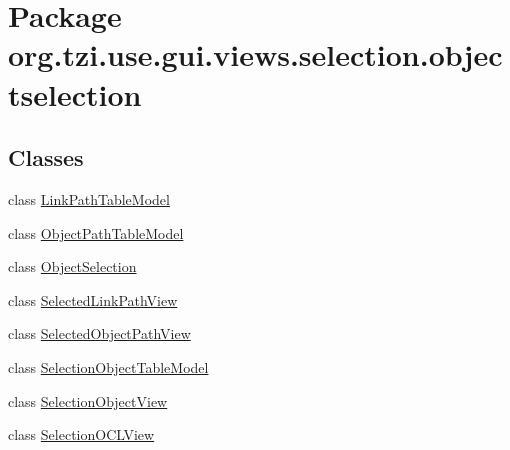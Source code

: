 \hypertarget{namespaceorg_1_1tzi_1_1use_1_1gui_1_1views_1_1selection_1_1objectselection}{\section{Package org.\-tzi.\-use.\-gui.\-views.\-selection.\-objectselection}
\label{namespaceorg_1_1tzi_1_1use_1_1gui_1_1views_1_1selection_1_1objectselection}
}
\subsection*{Classes}
\begin{DoxyCompactItemize}
\item 
class \hyperlink{classorg_1_1tzi_1_1use_1_1gui_1_1views_1_1selection_1_1objectselection_1_1_link_path_table_model}{Link\-Path\-Table\-Model}
\item 
class \hyperlink{classorg_1_1tzi_1_1use_1_1gui_1_1views_1_1selection_1_1objectselection_1_1_object_path_table_model}{Object\-Path\-Table\-Model}
\item 
class \hyperlink{classorg_1_1tzi_1_1use_1_1gui_1_1views_1_1selection_1_1objectselection_1_1_object_selection}{Object\-Selection}
\item 
class \hyperlink{classorg_1_1tzi_1_1use_1_1gui_1_1views_1_1selection_1_1objectselection_1_1_selected_link_path_view}{Selected\-Link\-Path\-View}
\item 
class \hyperlink{classorg_1_1tzi_1_1use_1_1gui_1_1views_1_1selection_1_1objectselection_1_1_selected_object_path_view}{Selected\-Object\-Path\-View}
\item 
class \hyperlink{classorg_1_1tzi_1_1use_1_1gui_1_1views_1_1selection_1_1objectselection_1_1_selection_object_table_model}{Selection\-Object\-Table\-Model}
\item 
class \hyperlink{classorg_1_1tzi_1_1use_1_1gui_1_1views_1_1selection_1_1objectselection_1_1_selection_object_view}{Selection\-Object\-View}
\item 
class \hyperlink{classorg_1_1tzi_1_1use_1_1gui_1_1views_1_1selection_1_1objectselection_1_1_selection_o_c_l_view}{Selection\-O\-C\-L\-View}
\end{DoxyCompactItemize}
